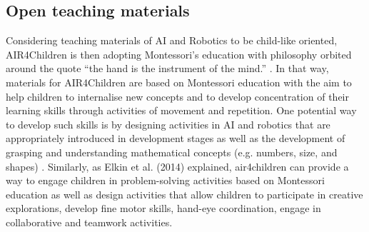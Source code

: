 \documentclass[sigconf]{acmart}
\begin{document}






\subsection{Open teaching materials}
Considering teaching materials of AI and Robotics to be child-like oriented, AIR4Children is then adopting Montessori's education with philosophy orbited around the quote “the hand is the instrument of the mind.” \cite{montessori2013absorbent}.
In that way, materials for AIR4Children are based on Montessori education with the aim to help children to internalise new concepts and to develop concentration of their learning skills through activities of movement and repetition.
One potential way to develop such skills is by designing activities in AI and robotics that are appropriately introduced in development stages \cite{bers2008, bers-horn2010, kazakoff-bers2012} as well as the development of grasping and understanding mathematical concepts (e.g. numbers, size, and shapes) \cite{bers2012, resnick1998}.
Similarly, as Elkin et al. (2014) \cite{elkin2014} explained, air4children can provide a way to engage children in problem-solving activities based on Montessori education as well as design activities that allow children to participate in creative explorations, develop fine motor skills, hand-eye coordination, engage in collaborative and teamwork activities.
\end{document}
